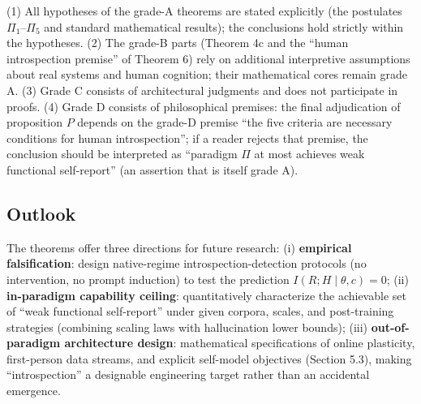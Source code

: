 \begin{remark}
(1) All hypotheses of the grade-A theorems are stated explicitly (the postulates $\Pi_1$--$\Pi_5$
and standard mathematical results); the conclusions hold strictly within the hypotheses.
(2) The grade-B parts (Theorem 4c and the ``human introspection premise'' of Theorem 6) rely on
additional interpretive assumptions about real systems and human cognition; their mathematical
cores remain grade A. (3) Grade C consists of architectural judgments and does not participate
in proofs. (4) Grade D consists of philosophical premises: the final adjudication of
proposition $P$ depends on the grade-D premise ``the five criteria are necessary conditions for
human introspection''; if a reader rejects that premise, the conclusion should be
interpreted as ``paradigm $\Pi$ at most achieves weak functional self-report'' (an assertion
that is itself grade A).
\end{remark}

\subsection{Outlook}

The theorems offer three directions for future research: (i) \textbf{empirical
falsification}: design native-regime introspection-detection protocols (no intervention, no
prompt induction) to test the prediction $I(R;H\mid\theta,c)=0$; (ii) \textbf{in-paradigm
capability ceiling}: quantitatively characterize the achievable set of ``weak functional
self-report'' under given corpora, scales, and post-training strategies (combining scaling
laws\cite{hoffmann-2022-chinchilla} with hallucination lower
bounds\cite{kalai-vempala-2023-calib}); (iii) \textbf{out-of-paradigm architecture design}:
mathematical specifications of online plasticity, first-person data streams, and explicit
self-model objectives (Section 5.3), making ``introspection'' a designable engineering target
rather than an accidental emergence.

\clearpage
